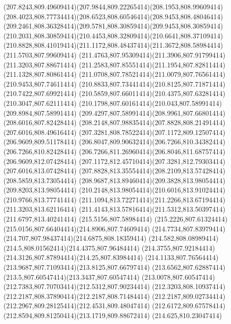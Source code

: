 {{	\curveto(207.8243,809.49609414)(207.9844,809.22265414)(208.1953,808.99609414)
	\curveto(208.4023,808.77734414)(208.6523,808.60546414)(208.9453,808.48046414)
	\curveto(209.2461,808.36328414)(209.5781,808.30859414)(209.9453,808.30859414)
	\curveto(210.2031,808.30859414)(210.4453,808.32809414)(210.6641,808.37109414)
	\curveto(210.8828,808.41019414)(211.1172,808.48437414)(211.3672,808.58984414)
	\lineto(211.5703,807.99609414)
	\curveto(211.4763,807.95309414)(211.3906,807.91799414)(211.3203,807.88671414)
	\curveto(211.2583,807.85551414)(211.1954,807.82811414)(211.1328,807.80861414)
	\curveto(211.0708,807.78521414)(211.0079,807.76561414)(210.9453,807.74611414)
	\curveto(210.8833,807.73441414)(210.8125,807.71871414)(210.7422,807.69921414)
	\curveto(210.5859,807.66011414)(210.4375,807.63281414)(210.3047,807.62111414)
	\curveto(210.1798,807.60161414)(210.043,807.58991414)(209.8984,807.58991414)
	\curveto(209.4297,807.58991414)(208.9961,807.66801414)(208.6016,807.82428414)
	\curveto(208.2148,807.98835414)(207.8828,808.21491414)(207.6016,808.49616414)
	\curveto(207.3281,808.78522414)(207.1172,809.12507414)(206.9609,809.51178414)
	\curveto(206.8047,809.90632414)(206.7266,810.34382414)(206.7266,810.82428414)
	\curveto(206.7266,811.26960414)(206.8046,811.68757414)(206.9609,812.07428414)
	\curveto(207.1172,812.45710414)(207.3281,812.79303414)(207.6016,813.07428414)
	\curveto(207.8828,813.35554414)(208.2109,813.57428414)(208.5859,813.73054414)
	\curveto(208.9687,813.89460414)(209.3828,813.98054414)(209.8203,813.98054414)
	\curveto(210.2148,813.98054414)(210.6016,813.91024414)(210.9766,813.77741414)
	\curveto(211.1094,813.72271414)(211.2266,813.67194414)(211.3203,813.62116414)
	\curveto(211.4143,813.57816414)(211.5312,813.50397414)(211.6797,813.40241414)
	\closepath
	\moveto(215.5156,807.58984414)
	\curveto(215.2226,807.61324414)(215.0156,807.66404414)(214.8906,807.74609414)
	\curveto(214.7734,807.83979414)(214.707,807.98437414)(214.6875,808.18359414)
	\curveto(214.582,808.08989414)(214.5,808.01562414)(214.4375,807.96484414)
	\curveto(214.3755,807.92184414)(214.3126,807.87894414)(214.25,807.83984414)
	\curveto(214.1133,807.76564414)(213.9687,807.71093414)(213.8125,807.66797414)
	\curveto(213.6562,807.62887414)(213.5,807.60547414)(213.3437,807.60547414)
	\curveto(213.0078,807.60547414)(212.7383,807.70703414)(212.5312,807.90234414)
	\curveto(212.3203,808.10937414)(212.2187,808.37890414)(212.2187,808.71484414)
	\curveto(212.2187,809.02734414)(212.2967,809.28125414)(212.4531,809.48047414)
	\curveto(212.6172,809.67578414)(212.8594,809.81250414)(213.1719,809.88672414)
	\lineto(214.625,810.23047414)
}}
